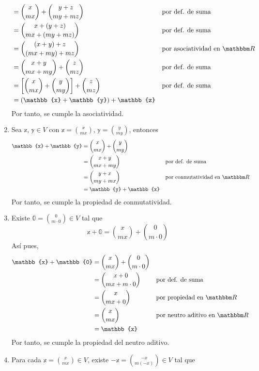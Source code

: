 \begin{example}
\begin{enumerate}[label=\roman*)]
\begin{align*}
            & = \binom{x}{mx} + \binom{y+z}{my+mz} && \text{por def. de suma} \\
            & = \binom{x+(y+z)}{mx+(my+mz)} && \text{por def. de suma} \\
            & = \binom{(x+y)+z}{(mx+my)+mz} && \text{por asociatividad en $\RR$} \\
            & = \binom{x+y}{mx+my} + \binom{z}{mz} && \text{por def. de suma} \\
            & = \left[ \binom{x}{mx} + \binom{y}{my} \right] + \binom{z}{mz} && \text{por def. de suma} \\
            & = (\mathbb{x} + \mathbb{y}) + \mathbb{z}
        \end{align*}
        Por tanto, se cumple la asociatividad.
        \item Sea $\mathbb{x}$, $\mathbb{y} \in V$ con $\displaystyle \mathbb{x} = \binom{x}{mx}$, $\displaystyle \mathbb{y} = \binom{y}{my}$, entonces
        \begin{align*}
            \mathbb{x} + \mathbb{y} & = \binom{x}{mx} + \binom{y}{my} \\
            & = \binom{x+y}{mx+my} && \text{por def. de suma} \\
            & = \binom{y+x}{my+mx} && \text{por conmutatividad en $\RR$} \\
            & = \mathbb{y} + \mathbb{x}
        \end{align*}
        Por tanto, se cumple la propiedad de conmutatividad.
        \item Existe $\displaystyle \mathbb{0} = \binom{0}{m \cdot 0} \in V$ tal que
        $$\mathbb{x} + \mathbb{0} = \binom{x}{mx} + \binom{0}{m \cdot 0}$$
        Así pues,
        \begin{align*}
            \mathbb{x} + \mathbb{0} & = \binom{x}{mx} + \binom{0}{m \cdot 0} \\
            & = \binom{x+0}{mx + m \cdot 0} && \text{por def. de suma} \\
            & = \binom{x}{mx + 0} && \text{por propiedad en $\RR$} \\
            & = \binom{x}{mx} && \text{por neutro aditivo en $\RR$} \\
            & = \mathbb{x}
        \end{align*}
        Por tanto, se cumple la propiedad del neutro aditivo.
        \item Para cada $\displaystyle \mathbb{x} = \binom{x}{mx} \in V$, existe $\displaystyle -\mathbb{x} = \binom{-x}{m(-x)} \in V$ tal que

\end{enumerate}
\end{example}
